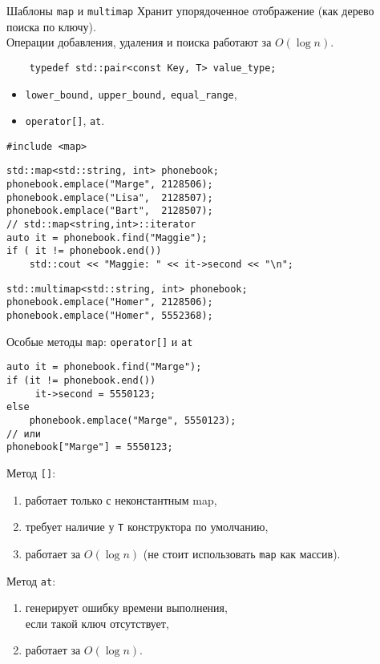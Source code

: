 \documentclass[aspectration=1610,t]{beamer}
\begin{document}
\begin{frame}[fragile]{Шаблоны {\tt map} и {\tt multimap}}
Хранит упорядоченное отображение (как дерево поиска по ключу).\\ 
Операции добавления, удаления и поиска работают за $O(\log n)$.
\begin{lstlisting}
    typedef std::pair<const Key, T> value_type;
\end{lstlisting}\vspace{-1mm}

\begin{itemize}
    \item {\tt lower\_bound,} {\tt upper\_bound,} {\tt equal\_range},
    \item {\tt operator[]}, {\tt at}.
\end{itemize}\vspace{-1mm}
\begin{lstlisting}
#include <map>
\end{lstlisting}\vspace{-1mm}
\begin{lstlisting}
std::map<std::string, int> phonebook;
phonebook.emplace("Marge", 2128506);
phonebook.emplace("Lisa",  2128507);
phonebook.emplace("Bart",  2128507);
// std::map<string,int>::iterator
auto it = phonebook.find("Maggie");
if ( it != phonebook.end())
    std::cout << "Maggie: " << it->second << "\n";
\end{lstlisting}\vspace{-1mm}
\begin{lstlisting}
std::multimap<std::string, int> phonebook;
phonebook.emplace("Homer", 2128506);
phonebook.emplace("Homer", 5552368);
\end{lstlisting}
\end{frame}

\begin{frame}[fragile]{Особые методы {\tt map}: {\tt operator[]} и {\tt at}}
\begin{lstlisting}
auto it = phonebook.find("Marge");
if (it != phonebook.end())
     it->second = 5550123;
else 
    phonebook.emplace("Marge", 5550123);
// или
phonebook["Marge"] = 5550123;
\end{lstlisting}
Метод {\tt {}[]}:
\begin{enumerate}
    \item работает только с неконстантным map,
    \item требует наличие у {\tt T} конструктора по умолчанию,
    \item работает за $O(\log n)$
    (не стоит использовать {\tt map} как массив).
\end{enumerate}
Метод {\tt at}:
\begin{enumerate}
    \item генерирует ошибку времени выполнения,\\
         если такой ключ отсутствует,
    \item работает за $O(\log n)$.
\end{enumerate}
\end{frame}
\end{document}
